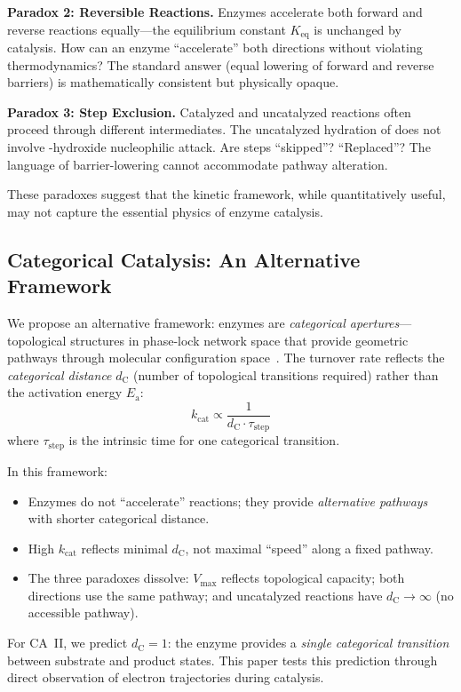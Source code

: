 \documentclass[twocolumn,amsmath,amssymb,aps,prb,superscriptaddress,longbibliography]{revtex4-2}
\newcommand{\dC}{d_{\mathrm{C}}}
\newcommand{\kcat}{k_{\mathrm{cat}}}
\newcommand{\Vmax}{V_{\mathrm{max}}}
\newcommand{\Ea}{E_{\mathrm{a}}}
\begin{document}
\textbf{Paradox 2: Reversible Reactions.} Enzymes accelerate both forward and reverse reactions equally---the equilibrium constant $K_{\text{eq}}$ is unchanged by catalysis. How can an enzyme ``accelerate'' both directions without violating thermodynamics? The standard answer (equal lowering of forward and reverse barriers) is mathematically consistent but physically opaque.

\textbf{Paradox 3: Step Exclusion.} Catalyzed and uncatalyzed reactions often proceed through different intermediates. The uncatalyzed hydration of  does not involve -hydroxide nucleophilic attack. Are steps ``skipped''? ``Replaced''? The language of barrier-lowering cannot accommodate pathway alteration.

These paradoxes suggest that the kinetic framework, while quantitatively useful, may not capture the essential physics of enzyme catalysis.

\subsection{Categorical Catalysis: An Alternative Framework}

We propose an alternative framework: enzymes are \emph{categorical apertures}---topological structures in phase-lock network space that provide geometric pathways through molecular configuration space~\cite{Sachikonye2025}. The turnover rate reflects the \emph{categorical distance} $\dC$ (number of topological transitions required) rather than the activation energy $\Ea$:
\begin{equation}
\kcat \propto \frac{1}{\dC \cdot \tau_{\text{step}}}
\label{eq:kcat-dc}
\end{equation}
where $\tau_{\text{step}}$ is the intrinsic time for one categorical transition.

In this framework:
\begin{itemize}
\item Enzymes do not ``accelerate'' reactions; they provide \emph{alternative pathways} with shorter categorical distance.
\item High $\kcat$ reflects minimal $\dC$, not maximal ``speed'' along a fixed pathway.
\item The three paradoxes dissolve: $\Vmax$ reflects topological capacity; both directions use the same pathway; and uncatalyzed reactions have $\dC \to \infty$ (no accessible pathway).
\end{itemize}

For CA~II, we predict $\dC = 1$: the enzyme provides a \emph{single categorical transition} between substrate and product states. This paper tests this prediction through direct observation of electron trajectories during catalysis.
\end{document}
